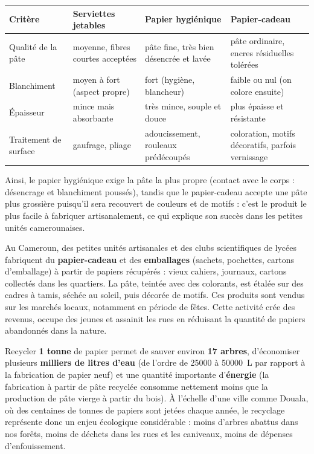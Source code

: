 \documentclass[11pt]{article}
\begin{document}
\begin{center}
\begin{tabularx}{\linewidth}{|l|X|X|X|}
\hline
\rowcolor{popblueL} \textbf{Critère} & \textbf{Serviettes jetables} & \textbf{Papier hygiénique} & \textbf{Papier-cadeau} \\
\hline
Qualité de la pâte & moyenne, fibres courtes acceptées & pâte fine, très bien désencrée et lavée & pâte ordinaire, encres résiduelles tolérées \\
\hline
Blanchiment & moyen à fort (aspect propre) & fort (hygiène, blancheur) & faible ou nul (on colore ensuite) \\
\hline
Épaisseur & mince mais absorbante & très mince, souple et douce & plus épaisse et résistante \\
\hline
Traitement de surface & gaufrage, pliage & adoucissement, rouleaux prédécoupés & coloration, motifs décoratifs, parfois vernissage \\
\hline
\end{tabularx}
\end{center}

Ainsi, le papier hygiénique exige la pâte la plus propre (contact avec le corps : désencrage et blanchiment poussés), tandis que le papier-cadeau accepte une pâte plus grossière puisqu'il sera recouvert de couleurs et de motifs : c'est le produit le plus facile à fabriquer artisanalement, ce qui explique son succès dans les petites unités camerounaises.

\begin{exemplebox}
Au Cameroun, des petites unités artisanales et des clubs scientifiques de lycées fabriquent du \textbf{papier-cadeau} et des \textbf{emballages} (sachets, pochettes, cartons d'emballage) à partir de papiers récupérés : vieux cahiers, journaux, cartons collectés dans les quartiers. La pâte, teintée avec des colorants, est étalée sur des cadres à tamis, séchée au soleil, puis décorée de motifs. Ces produits sont vendus sur les marchés locaux, notamment en période de fêtes. Cette activité crée des revenus, occupe des jeunes et assainit les rues en réduisant la quantité de papiers abandonnés dans la nature.
\end{exemplebox}

\begin{savaistu}
Recycler \textbf{1 tonne} de papier permet de sauver environ \textbf{17 arbres}, d'économiser plusieurs \textbf{milliers de litres d'eau} (de l'ordre de \num{25000} à \SI{50000}{L} par rapport à la fabrication de papier neuf) et une quantité importante d'\textbf{énergie} (la fabrication à partir de pâte recyclée consomme nettement moins que la production de pâte vierge à partir du bois). À l'échelle d'une ville comme Douala, où des centaines de tonnes de papiers sont jetées chaque année, le recyclage représente donc un enjeu écologique considérable : moins d'arbres abattus dans nos forêts, moins de déchets dans les rues et les caniveaux, moins de dépenses d'enfouissement.
\end{savaistu}
\end{document}
